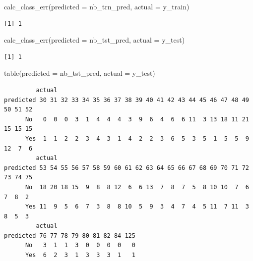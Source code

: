 \documentclass[
  letterpaper,
  DIV=11,
  numbers=noendperiod]{scrartcl}
\newenvironment{Shaded}{\begin{snugshade}}{\end{snugshade}}
\newcommand{\AttributeTok}[1]{\textcolor[rgb]{0.40,0.45,0.13}{#1}}
\newcommand{\FunctionTok}[1]{\textcolor[rgb]{0.28,0.35,0.67}{#1}}
\newcommand{\NormalTok}[1]{\textcolor[rgb]{0.00,0.23,0.31}{#1}}
\begin{document}
\begin{Shaded}
\begin{Highlighting}[]
\FunctionTok{calc\_class\_err}\NormalTok{(}\AttributeTok{predicted =}\NormalTok{ nb\_trn\_pred, }\AttributeTok{actual =}\NormalTok{ y\_train)}
\end{Highlighting}
\end{Shaded}

\begin{verbatim}
[1] 1
\end{verbatim}

\begin{Shaded}
\begin{Highlighting}[]
\FunctionTok{calc\_class\_err}\NormalTok{(}\AttributeTok{predicted =}\NormalTok{ nb\_tst\_pred, }\AttributeTok{actual =}\NormalTok{ y\_test)}
\end{Highlighting}
\end{Shaded}

\begin{verbatim}
[1] 1
\end{verbatim}

\begin{Shaded}
\begin{Highlighting}[]
\FunctionTok{table}\NormalTok{(}\AttributeTok{predicted =}\NormalTok{ nb\_tst\_pred, }\AttributeTok{actual =}\NormalTok{ y\_test)}
\end{Highlighting}
\end{Shaded}

\begin{verbatim}
         actual
predicted 30 31 32 33 34 35 36 37 38 39 40 41 42 43 44 45 46 47 48 49 50 51 52
      No   0  0  0  3  1  4  4  4  3  9  6  4  6  6 11  3 13 18 11 21 15 15 15
      Yes  1  1  2  2  3  4  3  1  4  2  2  3  6  5  3  5  1  5  5  9 12  7  6
         actual
predicted 53 54 55 56 57 58 59 60 61 62 63 64 65 66 67 68 69 70 71 72 73 74 75
      No  18 20 18 15  9  8  8 12  6  6 13  7  8  7  5  8 10 10  7  6  7  8  2
      Yes 11  9  5  6  7  3  8  8 10  5  9  3  4  7  4  5 11  7 11  3  8  5  3
         actual
predicted 76 77 78 79 80 81 82 84 125
      No   3  1  1  3  0  0  0  0   0
      Yes  6  2  3  1  3  3  3  1   1
\end{verbatim}
\end{document}
